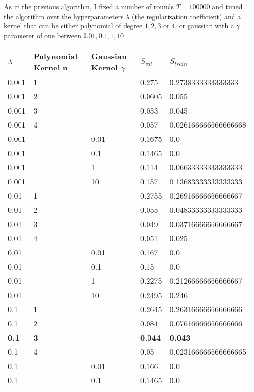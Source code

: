 As in the previous algorithm, I fixed a number of rounds $T = 100000$ and tuned the algorithm over the hyperparameters $\lambda$ (the regularization coefficient) and a kernel that can be either polynomial of degree $1,2,3$ or $4$, or gaussian with a $\gamma$ parameter of one between ${0.01, 0.1, 1, 10}$.\\
\begin{table}[]
    \begin{tabular}{|l|l|l|l|l|}
    \hline
    $\lambda$ & Polynomial Kernel n & Gaussian Kernel $\gamma$ & $S_{val}$ & $S_{train}$ \\ \hline
    0.001 & 1 &  & 0.275 & 0.2738333333333333 \\ \hline
    0.001 & 2 &  & 0.0605 & 0.055 \\ \hline
    0.001 & 3 &  & 0.053 & 0.045 \\ \hline
    0.001 & 4 &  & 0.057 & 0.026166666666666668 \\ \hline
    0.001 & & 0.01 & 0.1675 & 0.0 \\ \hline
    0.001 & & 0.1 & 0.1465 & 0.0 \\ \hline
    0.001 & & 1 & 0.114 & 0.06633333333333333 \\ \hline
    0.001 & & 10 & 0.157 & 0.13683333333333333 \\ \hline
    0.01 & 1 &  & 0.2755 & 0.26916666666666667 \\ \hline
    0.01 & 2 &  & 0.055 & 0.04833333333333333 \\ \hline
    0.01 & 3 &  & 0.049 & 0.03716666666666667 \\ \hline
    0.01 & 4 &  & 0.051 & 0.025 \\ \hline
    0.01 & & 0.01 & 0.167 & 0.0 \\ \hline
    0.01 & & 0.1 & 0.15 & 0.0 \\ \hline
    0.01 & & 1 & 0.2275 & 0.21266666666666667 \\ \hline
    0.01 & & 10 & 0.2495 & 0.246 \\ \hline
    0.1 & 1 &  & 0.2645 & 0.26316666666666666 \\ \hline
    0.1 & 2 &  & 0.084 & 0.07616666666666666 \\ \hline
    \textbf{0.1} & \textbf{3} &  & \textbf{0.044} & \textbf{0.043} \\ \hline
    0.1 & 4 &  & 0.05 & 0.023166666666666665 \\ \hline
    0.1 & & 0.01 & 0.166 & 0.0 \\ \hline
    0.1 & & 0.1 & 0.1465 & 0.0 \\ \hline

\end{tabular}
\end{table}
